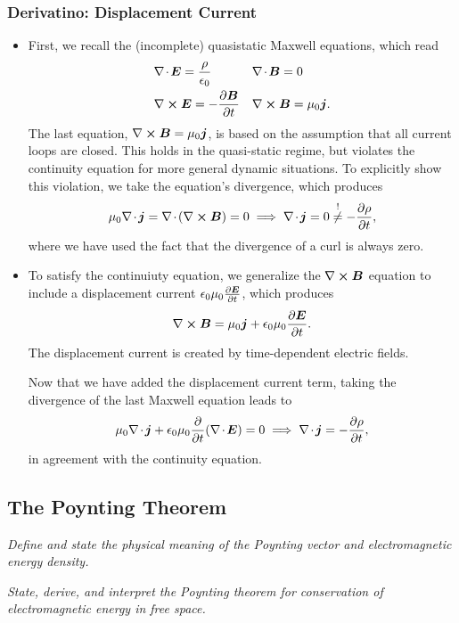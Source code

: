 \documentclass[11pt, a4paper]{article}
\renewcommand{\vec}[1]{\bm{#1}} %
\newcommand{\E}{\vec{E}} %
\newcommand{\B}{\vec{B}} %
\newcommand{\ee}{\epsilon_{0}}  %
\newcommand{\mm}{\mu_{0}}  %
\renewcommand{\j}{\vec{j}}  %
\renewcommand{\div}{\nabla \mspace{-2mu} \cdot \mspace{-2mu}}
\renewcommand{\curl}{\nabla \cross}
\begin{document}
\subsubsection{Derivatino: Displacement Current}
\begin{itemize}
	\item First, we recall the (incomplete) quasistatic Maxwell equations, which read 
	\begin{align*}
		&\div \E = \frac{\rho}{\ee} && \div \B = 0\\
		& \curl \E = - \pdv{\B}{t} && \curl \B = \mm \j.
	\end{align*}
	The last equation, $ \curl \B = \mm \j $, is based on the assumption that all current loops are closed. This holds in the quasi-static regime, but violates the continuity equation for more general dynamic situations. To explicitly show this violation, we take the equation's divergence, which produces
	\begin{equation*}
        \mm \div \j = \div (\curl \B) = 0 \implies \div \j = 0 \stackrel{!}{\neq} - \pdv{\rho}{t},
	\end{equation*}
    where we have used the fact that the divergence of a curl is always zero.

    \item To satisfy the continuiuty equation, we generalize the $ \curl \B $ equation to include a displacement current $ \ee \mm \pdv{\E}{t} $, which produces
	\begin{equation*}
		\curl \B = \mm \j + \ee \mm \pdv{\E}{t}.
	\end{equation*}
	The displacement current is created by time-dependent electric fields. 

    Now that we have added the displacement current term, taking the divergence of the last Maxwell equation leads to
	\begin{equation*}
		\mm \div \j + \ee \mm \pdv{t}(\div \E) = 0 \implies \div \j = - \pdv{\rho}{t},
	\end{equation*}
    in agreement with the continuity equation.
	
\end{itemize}

\subsection{The Poynting Theorem}
\textit{Define and state the physical meaning of the Poynting vector and electromagnetic energy density.}

\vspace{2mm}
\textit{State, derive, and interpret the Poynting theorem for conservation of electromagnetic energy in free space.}
\end{document}
